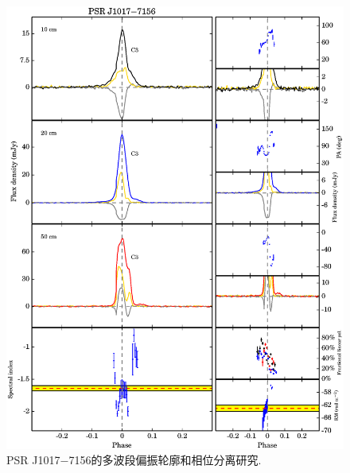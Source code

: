 \begin{figure}
\begin{center}
\includegraphics[width=6 in]{1017.ps}
\caption{PSR J1017$-$7156的多波段偏振轮廓和相位分离研究.}
\label{1017}
\end{center}
\end{figure}


